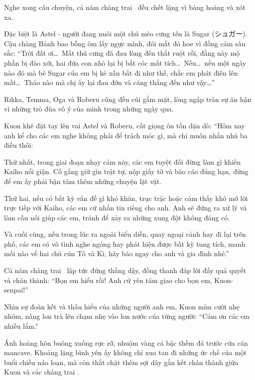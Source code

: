 \documentclass[../main.tex]{subfiles}
\begin{document}
Nghe xong câu chuyện, cả năm chàng trai \hls\ đều chết lặng vì bàng hoàng và xót xa.

Đặc biệt là Astel - người đang nuôi một chú mèo cưng tên là Sugar (シュガー). Cậu chàng Bảnh bao bỗng ôm lấy ngực mình, đôi mắt đỏ hoe vì đồng cảm sâu sắc:  ``Trời đất ơi\dots\ Mất thú cưng đã đau lòng đến thắt ruột rồi, đằng này mộ phần bị đào xới, hai đứa con nhỏ lại bị bắt cóc mất tích\dots\ Nếu\dots\ nếu một ngày nào đó mà bé Sugar của em bị kẻ xấu bắt đi như thế, chắc em phát điên lên mất\dots\ Thảo nào mà chị ấy lại đau đớn và căng thẳng đến như vậy\dots''

Rikka, Temma, Oga và Roberu cũng đều cúi gằm mặt, lòng ngập tràn sự ân hận vì những trò đùa vô ý của mình trong những ngày qua.

Kuon khẽ đặt tay lên vai Astel và Roberu, cất giọng ôn tồn dặn dò: ``Hôm nay anh kể cho các em nghe không phải để trách móc gì, mà chỉ muốn nhắn nhủ ba điều thôi:

Thứ nhất, trong giai đoạn nhạy cảm này, các em tuyệt đối đừng làm gì khiến Kaiho nổi giận. Cố gắng giữ gìn trật tự, nộp giấy tờ và báo cáo đúng hạn, đừng để em ấy phải bận tâm thêm những chuyện lặt vặt.

Thứ hai, nếu có bất kỳ vấn đề gì khó khăn, trục trặc hoặc cảm thấy khó mở lời trực tiếp với Kaiho, các em cứ nhắn tin riêng cho anh. Anh sẽ đứng ra xử lý và làm cầu nối giúp các em, tránh để xảy ra những xung đột không đáng có.

Và cuối cùng, nếu trong lúc ra ngoài biểu diễn, quay ngoại cảnh hay đi lại trên phố, các em có vô tình nghe ngóng hay phát hiện được bất kỳ tung tích, manh mối nào về hai chú cún Tô và Ki, hãy báo ngay cho anh và gia đình nhé.''

Cả năm chàng trai \hls\ lập tức đứng thẳng dậy, đồng thanh đáp lời đầy quả quyết và chân thành: ``Bọn em hiểu rồi! Anh cứ yên tâm giao cho bọn em, Kuon-senpai!''

Nhìn sự đoàn kết và thấu hiểu của những người anh em, Kuon mỉm cười nhẹ nhõm, nâng lon trà lên chạm nhẹ vào lon nước của từng người: ``Cảm ơn các em nhiều lắm.''

Ánh hoàng hôn buông xuống rực rỡ, nhuộm vàng cả bậc thềm đá trước cửa căn mancave. Khoảng lặng bình yên ấy không chỉ xua tan đi những ức chế của một buổi chiều náo loạn, mà còn thắt chặt thêm sợi dây gắn kết chân thành giữa Kuon và các chàng trai \hls.
\end{document}
